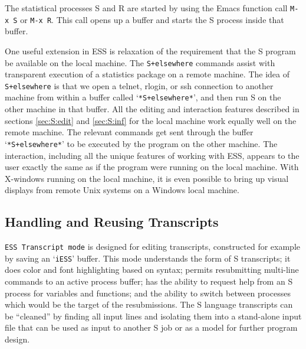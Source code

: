 \documentclass{article}
\newcommand{\stexttt}[1]{{\small\texttt{#1}}}
\newcommand{\file}[1]{`\stexttt{#1}'}
\begin{document}
The statistical processes S and R are started by using the Emacs
function call \stexttt{M-x~S} or \stexttt{M-x~R}.  This call opens up
a buffer and starts the S process inside that buffer.

One useful extension in ESS is relaxation of the requirement that the
S program %
be available on the local machine.  The
\stexttt{S+elsewhere} commands assist with transparent execution of a
statistics package on a remote machine.  The idea of
\stexttt{S+elsewhere} is that we open a telnet, rlogin, or ssh
connection to another machine from within a buffer called
\file{*S+elsewhere*}, and then run S on the other machine in that
buffer.  All the editing and interaction features described in
sections \ref{sec:S:edit} and \ref{sec:S:inf} for the local machine
work equally well on the remote machine.  The relevant commands get
sent through the buffer \file{*S+elsewhere*} to be executed by the
program on the other machine.  The interaction, including all the
unique features of working with ESS, appears to the user exactly the
same as if the program were running on the local machine.  With
X-windows running on the local machine, it is even possible to bring
up visual displays from remote Unix systems on a Windows local
machine.

\subsection{Handling and Reusing Transcripts}
\label{sec:S:trans}

\stexttt{ESS Transcript mode} is designed
for editing transcripts, constructed for example by saving
an \file{iESS} buffer.  This mode understands the form of S
transcripts; it does color and font highlighting based on syntax; permits 
resubmitting
multi-line commands to an active process buffer; has the ability to
request help from an S process for variables and functions; and the ability to
switch between processes which would be the target of the resubmissions.
The S language transcripts can be ``cleaned'' by
finding all input lines and isolating them into a stand-alone input file
that can be used as input to another S job or as a model for further
program design.
\end{document}
